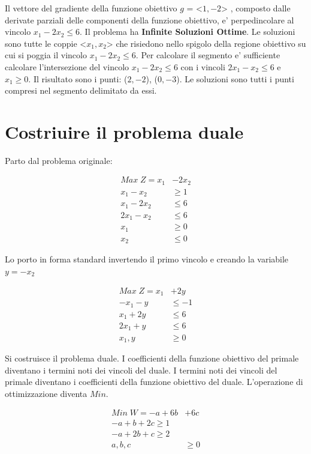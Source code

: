 \documentclass[a4paper,12pt,oneside]{article}
\begin{document}
    Il vettore del gradiente della funzione obiettivo $g$ = <$1, -2$> , composto dalle derivate parziali delle componenti della funzione obiettivo, e' perpedincolare al vincolo $x_1 - 2x_2 \leq 6$.
    Il problema ha \textbf{Infinite Soluzioni Ottime}.
    Le soluzioni sono tutte le coppie <$x_1, x_2$> che risiedono nello spigolo della regione obiettivo su cui si poggia il vincolo $x_1 - 2x_2 \leq 6$.
    Per calcolare il segmento e' sufficiente calcolare l'intersezione del vincolo $x_1 - 2x_2 \leq 6$ con i vincoli $2x_1 - x_2 \leq 6$ e $x_1 \geq 0$.
    Il risultato sono i punti: ($2, -2$),  ($0, -3$). Le soluzioni sono tutti i punti compresi nel segmento delimitato da essi.

    \section{Costriuire il problema duale}

    Parto dal problema originale:
    
    \begin{align*}
        Max \; Z = x_1 &- 2 x_2 \\
        x_1 - x_2 & \geq 1 \\
        x_1 - 2 x_2 & \leq 6 \\
        2 x_1 - x_2 & \leq 6 \\
        x_1 & \geq 0 \\
        x_2 & \leq 0
    \end{align*}

    Lo porto in forma standard invertendo il primo vincolo e creando la variabile $y = -x_2$
    
    \begin{align*}
        Max \; Z = x_1 &+ 2 y \\
        -x_1 - y & \leq -1 \\
        x_1 + 2 y & \leq 6 \\
        2 x_1 + y & \leq 6 \\
        x_1, y & \geq 0
    \end{align*}

    Si costruisce il problema duale.
    I coefficienti della funzione obiettivo del primale diventano i termini noti dei vincoli del duale.
    I termini noti dei vincoli del primale diventano i coefficienti della funzione obiettivo del duale.
    L'operazione di ottimizzazione diventa $Min$.
    
    \begin{align*}
        Min \; W = - a + 6 b &+ 6 c \\
        -a + b + 2 c \geq 1 \\
        -a + 2 b + c \geq 2 \\
        a, b, c & \geq 0
    \end{align*}
\end{document}

